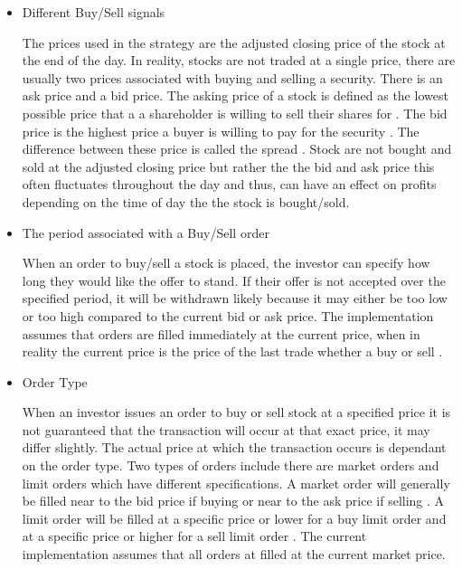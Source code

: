 \begin{itemize}
    \item Different Buy/Sell signals 
    
    The prices used in the strategy are the adjusted closing price of the stock at the end of the day. In reality, stocks are not traded at a single price, there are usually two prices associated with buying and selling a security. There is an ask price and a bid price. The asking price of a stock is defined as the lowest possible price that a a shareholder is willing to sell their shares for \cite{bid_ask}. The bid price is the highest price a buyer is willing to pay for the security \cite{bid_ask}. The difference between these price is called the spread \cite{bid_ask}. Stock are not bought and sold at the adjusted closing price but rather the the bid and ask price this often fluctuates throughout the day and thus, can have an effect on profits depending on the time of day the the stock is bought/sold.
    
    \item The period associated with a Buy/Sell order 
    
    When an order to buy/sell a stock is placed, the investor can specify how long they would like the offer to stand. If their offer is not accepted over the specified period, it will be withdrawn likely because it may either be too low or too high compared to the current bid or ask price. The implementation assumes that orders are filled immediately at the current price, when in reality the current price is the price of the last trade whether a buy or sell \cite{bid_ask}.   
    
    \item Order Type
    
    When an investor issues an order to buy or sell stock at a specified price it is not guaranteed that the transaction will occur at that exact price, it may differ slightly. The actual price at which the transaction occurs is dependant on the order type. Two types of orders include there are market orders and limit orders which have different specifications. A market order will generally be filled near to the bid price if buying or near to the ask price if selling \cite{orders}. A limit order will be filled at a specific price or lower for a buy limit order and at a specific price or higher for a sell limit order \cite{orders}. The current implementation assumes that all orders at filled at the current market price.
\end{itemize}

